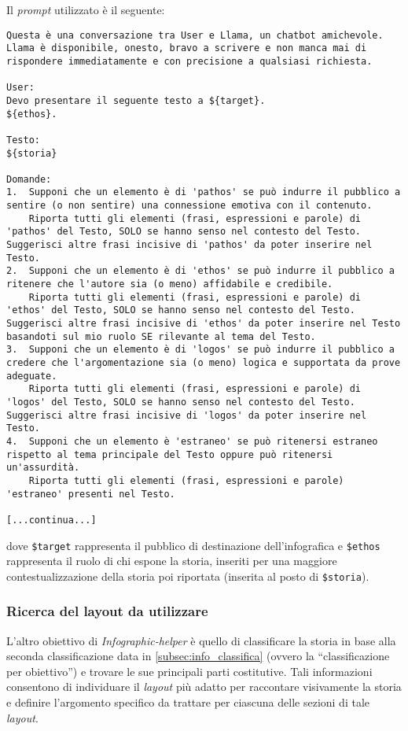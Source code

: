Il \emph{prompt} utilizzato è il seguente:
\begin{lstlisting}[style=htmlcssjs]
Questa è una conversazione tra User e Llama, un chatbot amichevole. Llama è disponibile, onesto, bravo a scrivere e non manca mai di rispondere immediatamente e con precisione a qualsiasi richiesta.

User: 
Devo presentare il seguente testo a ${target}.
${ethos}.

Testo:
${storia}

Domande:
1.	Supponi che un elemento è di 'pathos' se può indurre il pubblico a sentire (o non sentire) una connessione emotiva con il contenuto.
    Riporta tutti gli elementi (frasi, espressioni e parole) di 'pathos' del Testo, SOLO se hanno senso nel contesto del Testo. Suggerisci altre frasi incisive di 'pathos' da poter inserire nel Testo.
2.  Supponi che un elemento è di 'ethos' se può indurre il pubblico a ritenere che l'autore sia (o meno) affidabile e credibile.
    Riporta tutti gli elementi (frasi, espressioni e parole) di 'ethos' del Testo, SOLO se hanno senso nel contesto del Testo. Suggerisci altre frasi incisive di 'ethos' da poter inserire nel Testo basandoti sul mio ruolo SE rilevante al tema del Testo.
3.  Supponi che un elemento è di 'logos' se può indurre il pubblico a credere che l'argomentazione sia (o meno) logica e supportata da prove adeguate.
    Riporta tutti gli elementi (frasi, espressioni e parole) di 'logos' del Testo, SOLO se hanno senso nel contesto del Testo. Suggerisci altre frasi incisive di 'logos' da poter inserire nel Testo.
4.	Supponi che un elemento è 'estraneo' se può ritenersi estraneo rispetto al tema principale del Testo oppure può ritenersi un'assurdità.
    Riporta tutti gli elementi (frasi, espressioni e parole) 'estraneo' presenti nel Testo.

[...continua...]
\end{lstlisting}
dove \texttt{\$target} rappresenta il pubblico di destinazione dell'infografica e \texttt{\$ethos} rappresenta il ruolo di chi espone la storia, inseriti per una maggiore contestualizzazione della storia poi riportata (inserita al posto di \texttt{{\$storia}}).

\subsubsection{Ricerca del layout da utilizzare}
L'altro obiettivo di \emph{Infographic-helper} è quello di classificare la storia in base alla seconda classificazione data in \ref{subsec:info_classifica} (ovvero la ``classificazione per obiettivo'') e trovare le sue principali parti costitutive.
Tali informazioni consentono di individuare il \emph{layout} più adatto per raccontare visivamente la storia e definire l'argomento specifico da trattare per ciascuna delle sezioni di tale \emph{layout}.


